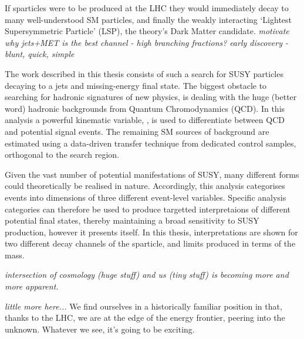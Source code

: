 If sparticles were to be produced at the LHC they would immediately decay to
many well-understood SM particles, and finally the weakly interacting `Lightest
Supersymmetric Particle' (LSP), the theory's Dark Matter candidate.
\emph{motivate why jets+MET is the best channel - high branching fractions?}
\emph{early discovery - blunt, quick, simple}

The work described in this thesis consists of such a search for SUSY particles
decaying to a jets and missing-energy final state. The biggest obstacle to
searching for hadronic signatures of new physics, is dealing with the huge
(better word) hadronic backgrounds from Quantum Chromodynamics (QCD). In this
analysis a powerful kinematic variable, \alphat, is used to differentiate
between QCD and potential signal events. The remaining SM sources of background
are estimated using a data-driven transfer technique from dedicated control
samples, orthogonal to the search region.

Given the vast number of potential manifestations of SUSY, many different forms
could theoretically be realised in nature. Accordingly, this analysis
categorises events into dimensions of three different event-level variables.
Specific analysis categories can therefore be used to produce targetted
interpretaions of different potential final states, thereby maintaining a broad
sensitivity to SUSY production, however it presents itself. In this thesis,
interpretations are shown for two different decay channels of the \sTop
sparticle, and limits produced in terms of the \sTop mass.


\emph{intersection of cosmology (huge stuff) and us (tiny stuff) is becoming more
and
more apparent.}

\emph{little more here...}
We find ourselves in a historically familiar position in that, thanks to the
LHC, we are at the edge of the energy frontier, peering into the unknown.
Whatever we see, it's going to be exciting.
